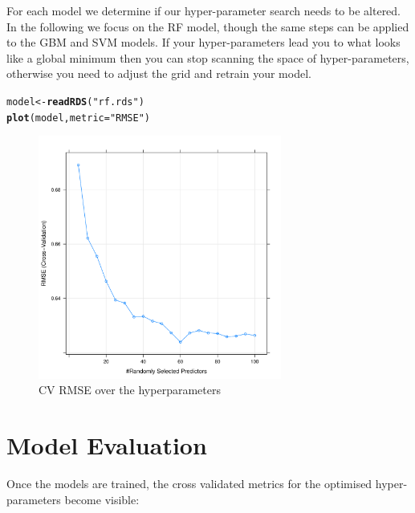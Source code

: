 \documentclass[twoside,a4wide,12pt]{article}\usepackage[]{graphicx}\usepackage[]{color}
\makeatletter
\newcommand{\hlstr}[1]{\textcolor[rgb]{0.192,0.494,0.8}{#1}}%
\newcommand{\hlstd}[1]{\textcolor[rgb]{0.345,0.345,0.345}{#1}}%
\newcommand{\hlkwb}[1]{\textcolor[rgb]{0.69,0.353,0.396}{#1}}%
\newcommand{\hlkwc}[1]{\textcolor[rgb]{0.333,0.667,0.333}{#1}}%
\newcommand{\hlkwd}[1]{\textcolor[rgb]{0.737,0.353,0.396}{\textbf{#1}}}%
\newenvironment{kframe}{%
 \def\at@end@of@kframe{}%
 \ifinner\ifhmode%
  \def\at@end@of@kframe{\end{minipage}}%
  \begin{minipage}{\columnwidth}%
 \fi\fi%
 \def\FrameCommand##1{\hskip\@totalleftmargin \hskip-\fboxsep
 \colorbox{shadecolor}{##1}\hskip-\fboxsep
     \hskip-\linewidth \hskip-\@totalleftmargin \hskip\columnwidth}%
 \MakeFramed {\advance\hsize-\width
   \@totalleftmargin\z@ \linewidth\hsize
   \@setminipage}}%
 {\par\unskip\endMakeFramed%
 \at@end@of@kframe}
\newenvironment{knitrout}{}{} %
\makeatother
\begin{document}
For each model we determine if our hyper-parameter search needs to be altered. In the following we focus on the RF model, though the same steps can be applied to the GBM and SVM models. If your hyper-parameters lead you to what looks like a global minimum then you can stop scanning the space of hyper-parameters, otherwise you need to adjust the grid and retrain your model.
\begin{knitrout}
\color{fgcolor}\begin{kframe}
\begin{alltt}
\hlstd{model} \hlkwb{<-} \hlkwd{readRDS}\hlstd{(}\hlstr{"rf.rds"}\hlstd{)}
\hlkwd{plot}\hlstd{(model,} \hlkwc{metric} \hlstd{=} \hlstr{"RMSE"}\hlstd{)}
\end{alltt}
\end{kframe}\begin{figure}[]


{\centering \includegraphics[width=8cm]{figure/unnamed-chunk-17} 

}

\caption[CV RMSE over the hyperparameters]{CV RMSE over the hyperparameters\label{fig:unnamed-chunk-17}}
\end{figure}


\end{knitrout}

\section{Model Evaluation}

Once the models are trained, the cross validated metrics for the optimised hyper-parameters become visible:
\end{document}
